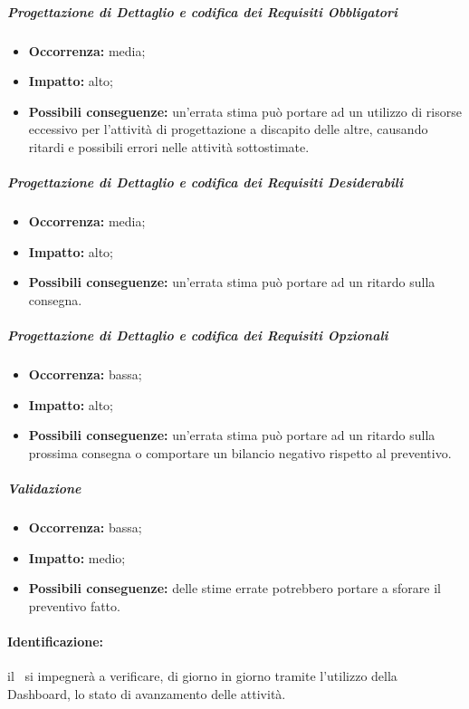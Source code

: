 \documentclass[../PianoProgetto.tex]{subfiles}
\begin{document}
		\subparagraph*{Progettazione di Dettaglio e codifica dei Requisiti Obbligatori}
			\begin{itemize}[label={-}]
				\item \textbf{Occorrenza:} media;
				\item \textbf{Impatto:} alto;
				\item \textbf{Possibili conseguenze:} un'errata stima può portare ad un utilizzo di risorse eccessivo per l'attività di progettazione a discapito delle altre, causando ritardi e possibili errori nelle attività sottostimate. 
			\end{itemize}
			
		\subparagraph*{Progettazione di Dettaglio e codifica dei Requisiti Desiderabili}
			\begin{itemize}[label={-}]
				\item \textbf{Occorrenza:} media;
				\item \textbf{Impatto:} alto;
				\item \textbf{Possibili conseguenze:} un'errata stima può portare ad un ritardo sulla consegna.
			\end{itemize}
			
		\subparagraph*{Progettazione di Dettaglio e codifica dei Requisiti Opzionali}
			\begin{itemize}[label={-}]
				\item \textbf{Occorrenza:} bassa;
				\item \textbf{Impatto:} alto;
				\item \textbf{Possibili conseguenze:} un'errata stima può portare ad un ritardo sulla prossima consegna o comportare un bilancio negativo rispetto al preventivo.
			\end{itemize}
			
		\subparagraph*{Validazione}
			\begin{itemize}[label={-}]
				\item \textbf{Occorrenza:} bassa;
				\item \textbf{Impatto:} medio;
				\item \textbf{Possibili conseguenze:} delle stime errate potrebbero portare a sforare il preventivo fatto.
			\end{itemize}
	
	\paragraph*{Identificazione:} il \responsabilediprogetto\ si impegnerà a verificare, di giorno in giorno tramite l'utilizzo della Dashboard\g, lo stato di avanzamento delle attività.
	
\end{document}
